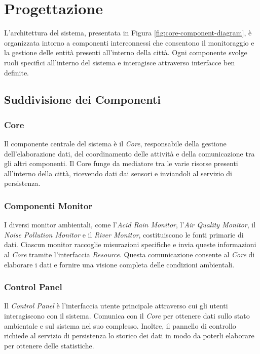 \documentclass[12pt]{article}
\begin{document}
\section{Progettazione}

L'architettura del sistema, presentata in Figura \ref{fig:core-component-diagram}, è organizzata intorno a componenti interconnessi che consentono il monitoraggio e la gestione delle entità presenti all'interno della città. Ogni componente svolge ruoli specifici all'interno del sistema e interagisce attraverso interfacce ben definite.

\subsection{Suddivisione dei Componenti}

\subsubsection{Core}
Il componente centrale del sistema è il \textit{Core}, responsabile della gestione dell'elaborazione dati, del coordinamento delle attività e della comunicazione tra gli altri componenti. Il Core funge da mediatore tra le varie risorse presenti all'interno della città, ricevendo dati dai sensori e inviandoli al servizio di persistenza.

\subsubsection{Componenti Monitor}
I diversi monitor ambientali, come l'\textit{Acid Rain Monitor}, l'\textit{Air Quality Monitor}, il \textit{Noise Pollution Monitor} e il \textit{River Monitor}, costituiscono le fonti primarie di dati. Ciascun monitor raccoglie misurazioni specifiche e invia queste informazioni al \textit{Core} tramite l'interfaccia \textit{Resource}. Questa comunicazione consente al \textit{Core} di elaborare i dati e fornire una visione completa delle condizioni ambientali.

\subsubsection{Control Panel}
Il \textit{Control Panel} è l'interfaccia utente principale attraverso cui gli utenti interagiscono con il sistema. Comunica con il \textit{Core} per ottenere dati sullo stato ambientale e sul sistema nel suo complesso. Inoltre, il pannello di controllo richiede al servizio di persistenza lo storico dei dati in modo da poterli elaborare per ottenere delle statistiche.
\end{document}
